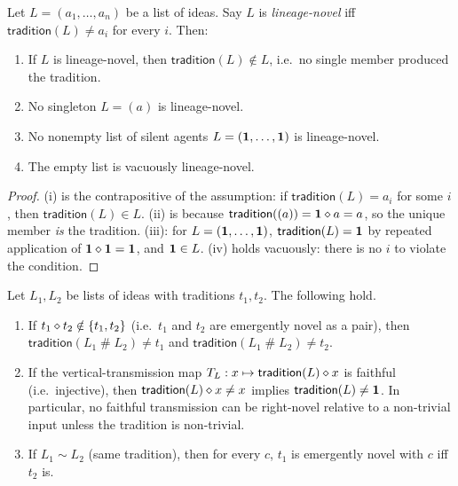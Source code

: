 \begin{theorem}
\label{thm:cumulative-novelty}
Let $L = (a_1,\dots,a_n)$ be a list of ideas. Say $L$ is
\emph{lineage-novel} iff $\mathsf{tradition}(L) \neq a_i$ for every $i$.
Then:
\begin{enumerate}
\item[(i)] If $L$ is lineage-novel, then $\mathsf{tradition}(L) \notin
  L$, i.e.\ no single member produced the tradition.
\item[(ii)] No singleton $L = (a)$ is lineage-novel.
\item[(iii)] No nonempty list of silent agents $L = (\mathbf{1},\dots,\mathbf{1})$
  is lineage-novel.
\item[(iv)] The empty list is vacuously lineage-novel.
\end{enumerate}
\end{theorem}

\begin{proof}
(i) is the contrapositive of the assumption: if $\mathsf{tradition}(L) =
a_i$ for some $i$, then $\mathsf{tradition}(L) \in L$. (ii) is because
$\mathsf{tradition}((a)) = \mathbf{1}\mathbin{\diamond} a = a$, so the unique member
\emph{is} the tradition. (iii): for $L = (\mathbf{1},\dots,\mathbf{1})$,
$\mathsf{tradition}(L) = \mathbf{1}$ by repeated application of $\mathbf{1}\mathbin{\diamond}
\mathbf{1} = \mathbf{1}$, and $\mathbf{1}\in L$. (iv) holds vacuously: there is no $i$
to violate the condition.
\end{proof}

\begin{theorem}
\label{thm:transmission-preservation}
Let $L_1, L_2$ be lists of ideas with traditions $t_1, t_2$. The
following hold.
\begin{enumerate}
\item[(i)] If $t_1 \mathbin{\diamond} t_2 \notin \{t_1, t_2\}$ (i.e.\ $t_1$ and
  $t_2$ are emergently novel as a pair), then
  $\mathsf{tradition}(L_1\mathbin{\#}L_2) \neq t_1$ and
  $\mathsf{tradition}(L_1\mathbin{\#}L_2) \neq t_2$.
\item[(ii)] If the vertical-transmission map $T_{L} : x \mapsto
  \mathsf{tradition}(L)\mathbin{\diamond} x$ is faithful (i.e.\ injective), then
  $\mathsf{tradition}(L)\mathbin{\diamond} x \neq x$ implies
  $\mathsf{tradition}(L)\neq \mathbf{1}$. In particular, no faithful
  transmission can be right-novel relative to a non-trivial input
  unless the tradition is non-trivial.
\item[(iii)] If $L_1 \sim L_2$ (same tradition), then for every $c$,
  $t_1$ is emergently novel with $c$ iff $t_2$ is.
\end{enumerate}
\end{theorem}

